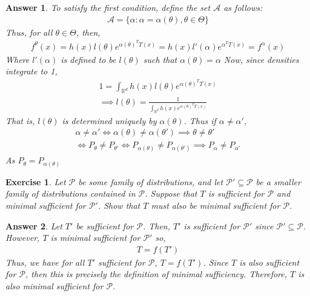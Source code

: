 \documentclass[12pt]{article}
\theoremstyle{colon}
\newtheorem{exercise}{Exercise}
\newtheorem*{answer}{Answer}
\begin{document}
\begin{answer}
  To satisfy the first condition, define the set $\mathcal{A}$ as follows:
  \begin{gather*}
    \mathcal{A} = \{ \alpha : \alpha = \alpha(\theta), \theta \in \Theta \}
  \end{gather*}
  Thus, for all $\theta \in \Theta$, then,
  \begin{gather*}
    f^\theta(x) = h(x)l(\theta)e^{\alpha(\theta)^T T(x)} = h(x)l'(\alpha)e^{\alpha^T T(x)} = f^\alpha(x)
  \end{gather*}
  Where $l'(\alpha)$ is defined to be $l(\theta)$ such that $\alpha(\theta) = \alpha$
  Now, since densities integrate to 1,
  \begin{gather*}
    1 = \int_{\mathbb{R}^d} h(x)l(\theta)e^{\alpha(\theta)^T T(x)} \\
    \implies l(\theta) = \frac{1}{\int_{\mathbb{R}^d} h(x)e^{\alpha(\theta)^T T(x)}}
  \end{gather*}
  That is, $l(\theta)$ is determined uniquely by $\alpha(\theta)$.
  Thus if $\alpha \neq \alpha'$,
  \begin{gather*}
    \alpha \neq \alpha' \Longleftrightarrow \alpha(\theta) \neq \alpha(\theta') \implies \theta \neq \theta' \\
    \Longleftrightarrow P_{\theta} \neq P_{\theta'} \Longleftrightarrow P_{\alpha(\theta)} \neq P_{\alpha(\theta')} \implies P_{\alpha} \neq P_{\alpha'}
  \end{gather*}
  As $P_\theta = P_{\alpha(\theta)}$
\end{answer}

\clearpage

\begin{exercise}
  Let $\mathcal{P}$ be some family of distributions, and let $\mathcal{P}' \subseteq \mathcal{P}$ be a smaller family of distributions contained in $\mathcal{P}$. Suppose that $T$ is sufficient for $\mathcal{P}$ and minimal sufficient for $\mathcal{P}'$. Show that $T$ must also be minimal sufficient for $\mathcal{P}$.
\end{exercise}

\begin{answer}
  Let $T'$ be sufficient for $\mathcal{P}$. Then, $T'$ is sufficient for $\mathcal{P}'$ since $\mathcal{P}' \subseteq \mathcal{P}$. However, $T$ is minimal sufficient for $\mathcal{P}'$ so,
  \begin{gather*}
    T = f(T')
  \end{gather*}
  Thus, we have for all $T'$ sufficient for $\mathcal{P}$, $T = f(T')$. Since $T$ is also sufficient for $\mathcal{P}$, then this is precisely the definition of minimal sufficiency. Therefore, $T$ is also minimal sufficient for $\mathcal{P}$.
\end{answer}
\end{document}
